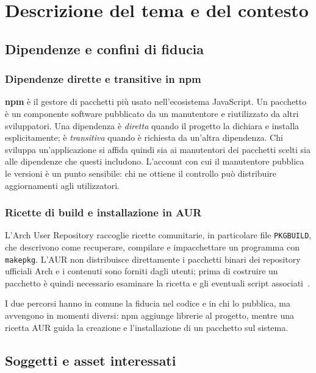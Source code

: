 \section{Descrizione del tema e del contesto}
\label{sec:contesto}

\subsection{Dipendenze e confini di fiducia}
\subsubsection{Dipendenze dirette e transitive in npm}

\textbf{npm} è il gestore di pacchetti più usato nell'ecosistema JavaScript.
Un pacchetto è un componente software pubblicato da un manutentore e riutilizzato
da altri sviluppatori. Una dipendenza è \emph{diretta} quando il progetto la
dichiara e installa esplicitamente; è \emph{transitiva} quando è richiesta da
un'altra dipendenza. Chi sviluppa un'applicazione si affida quindi sia ai
manutentori dei pacchetti scelti sia alle dipendenze che questi includono.
L'account con cui il manutentore pubblica le versioni è un punto sensibile:
chi ne ottiene il controllo può distribuire aggiornamenti agli utilizzatori.

\subsubsection{Ricette di build e installazione in AUR}

L'Arch User Repository raccoglie ricette comunitarie, in particolare file
\texttt{PKGBUILD}, che descrivono come recuperare, compilare e impacchettare un
programma con \texttt{makepkg}. L'AUR non distribuisce direttamente i pacchetti
binari dei repository ufficiali Arch e i contenuti sono forniti dagli utenti;
prima di costruire un pacchetto è quindi necessario esaminare la ricetta e gli
eventuali script associati~\cite{archwiki-aur}.

I due percorsi hanno in comune la fiducia nel codice e in chi lo pubblica, ma
avvengono in momenti diversi: npm aggiunge librerie al progetto, mentre una
ricetta AUR guida la creazione e l'installazione di un pacchetto sul sistema.

\subsection{Soggetti e asset interessati}
